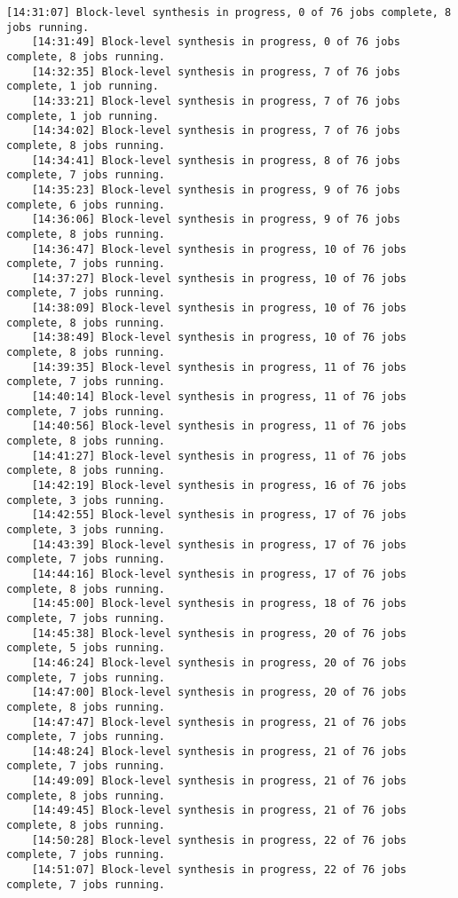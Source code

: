 \begin{lstlisting}[caption=Содержимое файла v++\_vinc.log, label={log1}]
	[14:31:07] Block-level synthesis in progress, 0 of 76 jobs complete, 8 jobs running.
	[14:31:49] Block-level synthesis in progress, 0 of 76 jobs complete, 8 jobs running.
	[14:32:35] Block-level synthesis in progress, 7 of 76 jobs complete, 1 job running.
	[14:33:21] Block-level synthesis in progress, 7 of 76 jobs complete, 1 job running.
	[14:34:02] Block-level synthesis in progress, 7 of 76 jobs complete, 8 jobs running.
	[14:34:41] Block-level synthesis in progress, 8 of 76 jobs complete, 7 jobs running.
	[14:35:23] Block-level synthesis in progress, 9 of 76 jobs complete, 6 jobs running.
	[14:36:06] Block-level synthesis in progress, 9 of 76 jobs complete, 8 jobs running.
	[14:36:47] Block-level synthesis in progress, 10 of 76 jobs complete, 7 jobs running.
	[14:37:27] Block-level synthesis in progress, 10 of 76 jobs complete, 7 jobs running.
	[14:38:09] Block-level synthesis in progress, 10 of 76 jobs complete, 8 jobs running.
	[14:38:49] Block-level synthesis in progress, 10 of 76 jobs complete, 8 jobs running.
	[14:39:35] Block-level synthesis in progress, 11 of 76 jobs complete, 7 jobs running.
	[14:40:14] Block-level synthesis in progress, 11 of 76 jobs complete, 7 jobs running.
	[14:40:56] Block-level synthesis in progress, 11 of 76 jobs complete, 8 jobs running.
	[14:41:27] Block-level synthesis in progress, 11 of 76 jobs complete, 8 jobs running.
	[14:42:19] Block-level synthesis in progress, 16 of 76 jobs complete, 3 jobs running.
	[14:42:55] Block-level synthesis in progress, 17 of 76 jobs complete, 3 jobs running.
	[14:43:39] Block-level synthesis in progress, 17 of 76 jobs complete, 7 jobs running.
	[14:44:16] Block-level synthesis in progress, 17 of 76 jobs complete, 8 jobs running.
	[14:45:00] Block-level synthesis in progress, 18 of 76 jobs complete, 7 jobs running.
	[14:45:38] Block-level synthesis in progress, 20 of 76 jobs complete, 5 jobs running.
	[14:46:24] Block-level synthesis in progress, 20 of 76 jobs complete, 7 jobs running.
	[14:47:00] Block-level synthesis in progress, 20 of 76 jobs complete, 8 jobs running.
	[14:47:47] Block-level synthesis in progress, 21 of 76 jobs complete, 7 jobs running.
	[14:48:24] Block-level synthesis in progress, 21 of 76 jobs complete, 7 jobs running.
	[14:49:09] Block-level synthesis in progress, 21 of 76 jobs complete, 8 jobs running.
	[14:49:45] Block-level synthesis in progress, 21 of 76 jobs complete, 8 jobs running.
	[14:50:28] Block-level synthesis in progress, 22 of 76 jobs complete, 7 jobs running.
	[14:51:07] Block-level synthesis in progress, 22 of 76 jobs complete, 7 jobs running.

\end{lstlisting}
